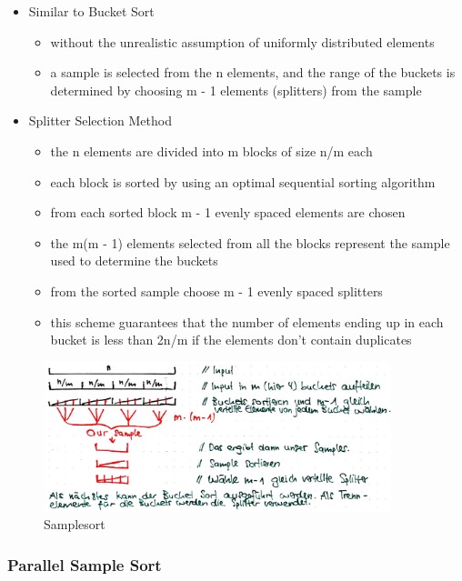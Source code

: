 \begin{itemize}
\tightlist
\item
  Similar to Bucket Sort

  \begin{itemize}
  \tightlist
  \item
    without the unrealistic assumption of uniformly distributed elements
  \item
    a sample is selected from the n elements, and the range of the
    buckets is determined by choosing m - 1 elements (splitters) from
    the sample
  \end{itemize}
\item
  Splitter Selection Method

  \begin{itemize}
  \tightlist
  \item
    the n elements are divided into m blocks of size n/m each
  \item
    each block is sorted by using an optimal sequential sorting
    algorithm
  \item
    from each sorted block m - 1 evenly spaced elements are chosen
  \item
    the m(m - 1) elements selected from all the blocks represent the
    sample used to determine the buckets
  \item
    from the sorted sample choose m - 1 evenly spaced splitters
  \item
    this scheme guarantees that the number of elements ending up in each
    bucket is less than 2n/m if the elements don't contain duplicates
  \end{itemize}
\end{itemize}

\begin{figure}[H]
\centering
\includegraphics[width=0.9\textwidth]{figures/samplesort.png}
\caption{Samplesort}
\end{figure}

\clearpage
\hypertarget{parallel-sample-sort}{%
\subsubsection{Parallel Sample Sort}\label{parallel-sample-sort}}

